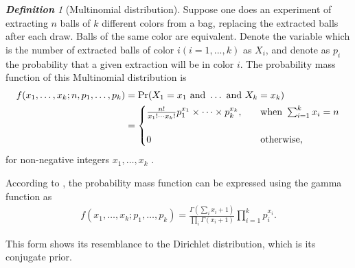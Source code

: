 \documentclass[12pt,oneside,a4paper]{book}
\theoremstyle{definition}
\theoremstyle{remark}
\newtheorem{defn}{\bf Definition}[subsection]
\begin{document}
					\begin{defn}[Multinomial distribution]
						Suppose one does an experiment of extracting $n$ balls of $k$ different colors from a bag, replacing the extracted balls after each draw. Balls of the same color are equivalent. Denote the variable which is the number of extracted balls of color $i (i = 1, ..., k)$ as $X_i$, and denote as $p_i$ the probability that a given extraction will be in color $i$. The probability mass function of this Multinomial distribution is
							\begin{equation}
									\begin{aligned}
										f(x_{1},\ldots ,x_{k};n,p_{1},\ldots ,p_{k})
											&= \Pr(X_{1}=x_{1}{\text{ and }}\dots {\text{ and }}X_{k}=x_{k})\\
											&={
												\begin{cases}{
														{n! \over x_{1}!\cdots x_{k}!} p_{1}^{x_{1}}\times \cdots \times p_{k}^{x_{k}}},\quad &{\text{when }}\sum _{i=1}^{k}x_{i}=n\\\\
														0	& {\text{otherwise,}}
												\end{cases}
											   }
									\end{aligned}
							\end{equation}
							for non-negative integers $x_1, \ldots, x_k$ \cite{berger2001statistical}.

							According to \cite{johnson1997multivariate}, the probability mass function can be expressed using the gamma function as
								\begin{equation}
									\begin{aligned}
										 f(x_{1},\dots ,x_{k};p_{1},\ldots ,p_{k})={\frac {\Gamma (\sum _{i}x_{i}+1)}{\prod _{i}\Gamma (x_{i}+1)}}\prod _{i=1}^{k}p_{i}^{x_{i}}.
									\end{aligned}
								\end{equation}
					\end{defn}

					This form shows its resemblance to the Dirichlet distribution, which is its conjugate prior.
\end{document}
